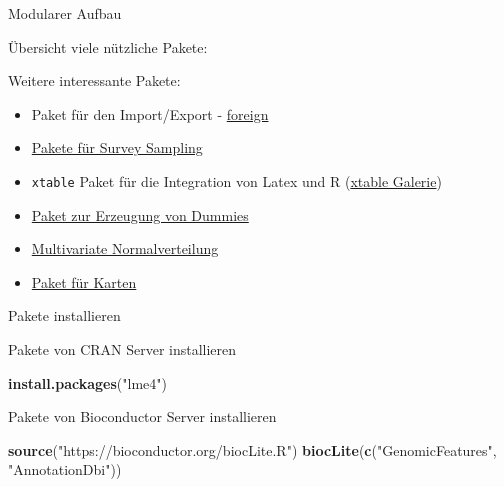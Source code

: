 \documentclass[ignorenonframetext,]{beamer}
\newenvironment{Shaded}{}{}
\newcommand{\KeywordTok}[1]{\textcolor[rgb]{0.00,0.44,0.13}{\textbf{{#1}}}}
\newcommand{\StringTok}[1]{\textcolor[rgb]{0.25,0.44,0.63}{{#1}}}
\newcommand{\NormalTok}[1]{{#1}}
\begin{document}
\begin{frame}[fragile]{Modularer Aufbau}
\begin{block}{Übersicht viele nützliche Pakete:}
\begin{block}{Weitere interessante Pakete:}
\begin{itemize}
\item
  Paket für den Import/Export -
  \href{http://cran.r-project.org/web/packages/foreign/foreign.pdf}{foreign}
\item
  \href{http://iase-web.org/documents/papers/icots8/ICOTS8_4J1_TILLE.pdf}{Pakete
  für Survey Sampling}
\item
  \texttt{xtable} Paket für die Integration von Latex und R
  (\href{http://cran.r-project.org/web/packages/xtable/vignettes/xtableGallery.pdf}{xtable
  Galerie})
\item
  \href{http://cran.r-project.org/web/packages/dummies/dummies.pdf}{Paket
  zur Erzeugung von Dummies}
\item
  \href{http://cran.r-project.org/web/packages/mvtnorm/index.html}{Multivariate
  Normalverteilung}
\item
  \href{http://www.r-bloggers.com/tag/maptools/}{Paket für Karten}
\end{itemize}

\end{block}

\end{block}

\begin{block}{Pakete installieren}

\begin{block}{Pakete von CRAN Server installieren}

\begin{Shaded}
\begin{Highlighting}[]
\KeywordTok{install.packages}\NormalTok{(}\StringTok{"lme4"}\NormalTok{)}
\end{Highlighting}
\end{Shaded}

\end{block}

\begin{block}{Pakete von Bioconductor Server installieren}

\begin{Shaded}
\begin{Highlighting}[]
\KeywordTok{source}\NormalTok{(}\StringTok{"https://bioconductor.org/biocLite.R"}\NormalTok{)}
\KeywordTok{biocLite}\NormalTok{(}\KeywordTok{c}\NormalTok{(}\StringTok{"GenomicFeatures"}\NormalTok{, }\StringTok{"AnnotationDbi"}\NormalTok{))}
\end{Highlighting}
\end{Shaded}

\end{block}


\end{block}
\end{frame}
\end{document}

